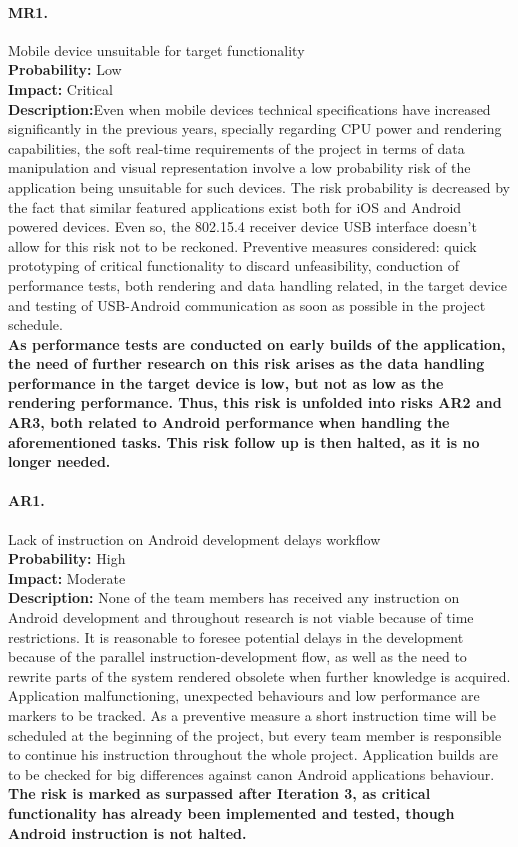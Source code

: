 		\paragraph{MR1.}Mobile device unsuitable for target functionality\\
		\textbf{Probability:} Low\\
		\textbf{Impact:} Critical\\
		\textbf{Description:}Even when mobile devices technical specifications have increased significantly in the previous years, specially regarding CPU power and rendering capabilities, the soft real-time requirements of the project in terms of data manipulation and visual representation involve a low probability risk of the application being unsuitable for such devices. The risk probability is decreased by the fact that similar featured applications exist both for iOS and Android powered devices. Even so, the 802.15.4 receiver device USB interface doesn't allow for this risk not to be reckoned.
		Preventive measures considered: quick prototyping of critical functionality to discard  unfeasibility, conduction of performance tests, both rendering and data handling related, in the target device and testing of USB-Android communication as soon as possible in the project schedule.\\
		\textbf{As performance tests are conducted on early builds of the application, the need of further research on this risk arises as the data handling performance in the target device is low, but not as low as the rendering performance. Thus, this risk is unfolded into risks AR2 and AR3, both related to Android performance when handling the aforementioned tasks. This risk follow up is then halted, as it is no longer needed.}

		\paragraph{AR1.}Lack of instruction on Android development delays workflow\\
		\textbf{Probability:} High\\
		\textbf{Impact:} Moderate\\
		\textbf{Description:} None of the team members has received any instruction on Android development and throughout research is not viable because of time restrictions. It is reasonable to foresee potential delays in the development because of the parallel instruction-development flow, as well as the need to rewrite parts of the system rendered obsolete when further knowledge is acquired.
		Application malfunctioning, unexpected behaviours and low performance are markers to be tracked.
		As a preventive measure a short instruction time will be scheduled at the beginning of the project, but every team member is responsible to continue his instruction throughout the whole project. Application builds are to be checked for big differences against canon Android applications behaviour.\\
		\textbf{The risk is marked as surpassed after Iteration 3, as critical functionality has already been implemented and tested, though Android instruction is not halted.}

